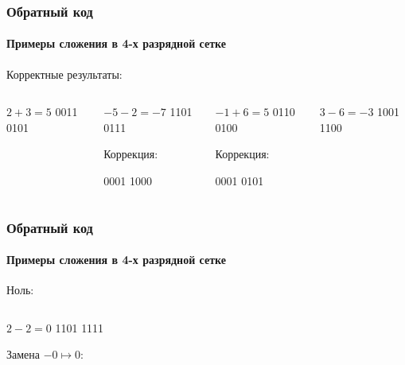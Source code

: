 \begin{frame}
    \frametitle{Обратный код}
    \framesubtitle{Примеры сложения в 4-х разрядной сетке}
    
    Корректные результаты:
    \begin{columns}
            \begin{block}{$2+3=5$}
                 \center
                          {0011}
                          {0101}
            \end{block}
            \begin{block}{${-5}-2=-7$}
                 \center
                          {1101}
                          {0111}
                          
                 Коррекция:
                          
                          {0001}
                          {1000}
            \end{block}
            \begin{block}{${-1}+6=5$}
                 \center
                          {0110}
                          {0100}

                 Коррекция:
                          
                          {0001}
                          {0101}
            \end{block}
            \begin{block}{$3-6={-3}$}
                 \center
                          {1001}
                          {1100}
            \end{block}
    \end{columns}
\end{frame}

\begin{frame}
    \frametitle{Обратный код}
    \framesubtitle{Примеры сложения в 4-х разрядной сетке}
    
    Ноль:
    \begin{columns}
            \begin{block}{$2-2=0$}
                 \center
                          {1101}
                          {1111}
                          
                 Замена $-0\mapsto 0$:
                          
            \end{block}
    \end{columns}
\end{frame}

